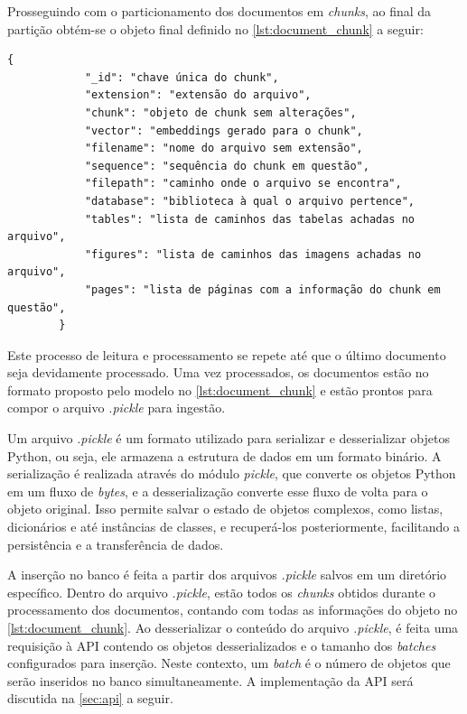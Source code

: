 \documentclass[a4paper, 12pt]{article}
\begin{document}
    Prosseguindo com o particionamento dos documentos em \textit{chunks}, ao final da partição obtém-se o objeto final definido no \autoref{lst:document_chunk} a seguir:

    \begin{lstlisting}[caption={Objeto de dados para inserção no banco vetorial.}, label={lst:document_chunk}]
        {
            "_id": "chave única do chunk",
            "extension": "extensão do arquivo",
            "chunk": "objeto de chunk sem alterações",
            "vector": "embeddings gerado para o chunk",
            "filename": "nome do arquivo sem extensão",
            "sequence": "sequência do chunk em questão",
            "filepath": "caminho onde o arquivo se encontra",
            "database": "biblioteca à qual o arquivo pertence",
            "tables": "lista de caminhos das tabelas achadas no arquivo",
            "figures": "lista de caminhos das imagens achadas no arquivo",
            "pages": "lista de páginas com a informação do chunk em questão",
        }
    \end{lstlisting}

    Este processo de leitura e processamento se repete até que o último documento seja devidamente processado. Uma vez processados, os documentos estão no formato proposto pelo modelo no \autoref{lst:document_chunk} e estão prontos para compor o arquivo \textit{.pickle} para ingestão. 
    
    Um arquivo \textit{.pickle} é um formato utilizado para serializar e desserializar objetos Python, ou seja, ele armazena a estrutura de dados em um formato binário. A serialização é realizada através do módulo \textit{pickle}, que converte os objetos Python em um fluxo de \textit{bytes}, e a desserialização converte esse fluxo de volta para o objeto original. Isso permite salvar o estado de objetos complexos, como listas, dicionários e até instâncias de classes, e recuperá-los posteriormente, facilitando a persistência e a transferência de dados.

    A inserção no banco é feita a partir dos arquivos \textit{.pickle} salvos em um diretório específico. Dentro do arquivo \textit{.pickle}, estão todos os \textit{chunks} obtidos durante o processamento dos documentos, contando com todas as informações do objeto no \autoref{lst:document_chunk}. Ao desserializar o conteúdo do arquivo \textit{.pickle}, é feita uma requisição à API contendo os objetos desserializados e o tamanho dos \textit{batches} configurados para inserção. Neste contexto, um \textit{batch} é o número de objetos que serão inseridos no banco simultaneamente. A implementação da API será discutida na \autoref{sec:api} a seguir.
\end{document}
